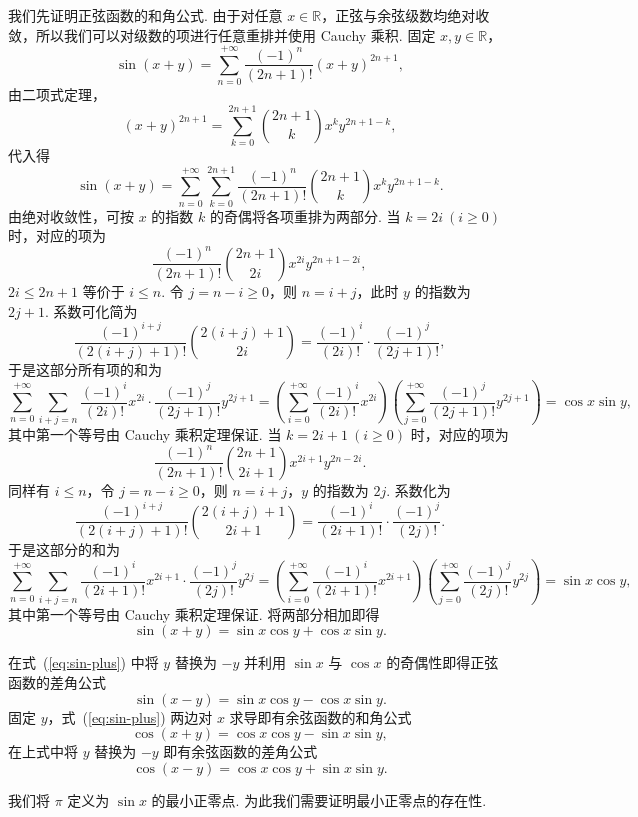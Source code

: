 \documentclass[../main.tex]{subfiles}
\begin{document}
我们先证明正弦函数的和角公式. 由于对任意 $x \in \mathbb R$，正弦与余弦级数均绝对收敛，所以我们可以对级数的项进行任意重排并使用 Cauchy 乘积. 固定 $x, y \in\mathbb R$，
$$
\sin(x+y) = \sum_{n=0}^{+\infty} \frac{(-1)^n}{(2n+1)!} (x+y)^{2n+1}, 
$$
由二项式定理，
$$
(x+y)^{2n+1} = \sum_{k=0}^{2n+1} \binom{2n+1}{k} x^k y^{2n+1-k}, 
$$
代入得
$$
\sin(x+y) = \sum_{n=0}^{+\infty} \sum_{k=0}^{2n+1} \frac{(-1)^n}{(2n+1)!} \binom{2n+1}{k} x^k y^{2n+1-k}.
$$
由绝对收敛性，可按 $x$ 的指数 $k$ 的奇偶将各项重排为两部分.
当 $k = 2i\ (i \geqslant 0)$ 时，对应的项为
$$
\frac{(-1)^n}{(2n+1)!} \binom{2n+1}{2i} x^{2i} y^{2n+1-2i}, 
$$
$2i \leqslant 2n + 1$ 等价于 $i \leqslant n$. 令 $j = n - i \geqslant 0$，则 $n = i + j$，此时 $y$ 的指数为 $2j + 1$. 系数可化简为
$$
\frac{(-1)^{i+j}}{(2(i+j)+1)!} \binom{2(i+j)+1}{2i}
= \frac{(-1)^i}{(2i)!} \cdot \frac{(-1)^j}{(2j+1)!}, 
$$
于是这部分所有项的和为
$$
\sum_{n=0}^{+\infty} \sum_{i + j = n} \frac{(-1)^i}{(2i)!} x^{2i} \cdot \frac{(-1)^j}{(2j+1)!} y^{2j+1}
= \left( \sum_{i=0}^{+\infty} \frac{(-1)^i}{(2i)!} x^{2i} \right) \left( \sum_{j=0}^{+\infty} \frac{(-1)^j}{(2j+1)!} y^{2j+1} \right)
= \cos x \sin y, 
$$
其中第一个等号由 Cauchy 乘积定理保证. 
当 $k = 2i + 1\ (i \geqslant 0)$ 时，对应的项为
$$
\frac{(-1)^n}{(2n+1)!} \binom{2n+1}{2i+1} x^{2i+1} y^{2n-2i}.
$$
同样有 $i \leqslant n$，令 $j = n - i \geqslant 0$，则 $n = i + j$，$y$ 的指数为 $2j$. 系数化为
$$
\frac{(-1)^{i+j}}{(2(i+j)+1)!} \binom{2(i+j)+1}{2i+1}
= \frac{(-1)^i}{(2i+1)!} \cdot \frac{(-1)^j}{(2j)!}.
$$
于是这部分的和为
$$
\sum_{n=0}^{+\infty} \sum_{i + j = n} \frac{(-1)^i}{(2i+1)!} x^{2i+1} \cdot \frac{(-1)^j}{(2j)!} y^{2j}
= \left( \sum_{i=0}^{+\infty} \frac{(-1)^i}{(2i + 1)!} x^{2i + 1} \right) \left( \sum_{j=0}^{+\infty} \frac{(-1)^j}{(2j)!} y^{2j} \right)
= \sin x \cos y, 
$$
其中第一个等号由 Cauchy 乘积定理保证. 将两部分相加即得
\begin{equation} \label{eq:sin-plus}
    \sin(x + y) = \sin x \cos y + \cos x \sin y. 
\end{equation}

在式~(\ref{eq:sin-plus}) 中将 $y$ 替换为 $-y$ 并利用 $\sin x$ 与 $\cos x$ 的奇偶性即得正弦函数的差角公式 
$$
\sin(x - y) = \sin x \cos y - \cos x \sin y. 
$$
固定 $y$，式~(\ref{eq:sin-plus}) 两边对 $x$ 求导即有余弦函数的和角公式 
$$
\cos(x + y) = \cos x \cos y - \sin x \sin y, 
$$
在上式中将 $y$ 替换为 $-y$ 即有余弦函数的差角公式
$$
\cos(x - y) = \cos x \cos y + \sin x \sin y. 
$$

我们将 $\pi$ 定义为 $\sin x$ 的最小正零点. 为此我们需要证明最小正零点的存在性. 
\end{document}

